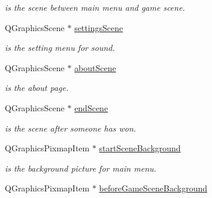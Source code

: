 \begin{DoxyCompactItemize}
\begin{DoxyCompactList}\small\item\em is the scene between main menu and game scene. \end{DoxyCompactList}\item 
Q\+Graphics\+Scene $\ast$ \hyperlink{class_game_menu_a034da5f5a381412e92d1764f5af32883}{settings\+Scene}\hypertarget{class_game_menu_a034da5f5a381412e92d1764f5af32883}{}\label{class_game_menu_a034da5f5a381412e92d1764f5af32883}

\begin{DoxyCompactList}\small\item\em is the setting menu for sound. \end{DoxyCompactList}\item 
Q\+Graphics\+Scene $\ast$ \hyperlink{class_game_menu_a347306846ed65b9ed5ed3d457e46c5ac}{about\+Scene}\hypertarget{class_game_menu_a347306846ed65b9ed5ed3d457e46c5ac}{}\label{class_game_menu_a347306846ed65b9ed5ed3d457e46c5ac}

\begin{DoxyCompactList}\small\item\em is the about page. \end{DoxyCompactList}\item 
Q\+Graphics\+Scene $\ast$ \hyperlink{class_game_menu_a235b359eff5bab01a8ca9d2b75466af1}{end\+Scene}\hypertarget{class_game_menu_a235b359eff5bab01a8ca9d2b75466af1}{}\label{class_game_menu_a235b359eff5bab01a8ca9d2b75466af1}

\begin{DoxyCompactList}\small\item\em is the scene after someone has won. \end{DoxyCompactList}\item 
Q\+Graphics\+Pixmap\+Item $\ast$ \hyperlink{class_game_menu_ab6fd3496d0426f663e9893a893764fcf}{start\+Scene\+Background}\hypertarget{class_game_menu_ab6fd3496d0426f663e9893a893764fcf}{}\label{class_game_menu_ab6fd3496d0426f663e9893a893764fcf}

\begin{DoxyCompactList}\small\item\em is the background picture for main menu. \end{DoxyCompactList}\item 
Q\+Graphics\+Pixmap\+Item $\ast$ \hyperlink{class_game_menu_a59aa0e84b5d4db53a62bb52480856c25}{before\+Game\+Scene\+Background}\hypertarget{class_game_menu_a59aa0e84b5d4db53a62bb52480856c25}{}\label{class_game_menu_a59aa0e84b5d4db53a62bb52480856c25}


\end{DoxyCompactItemize}
